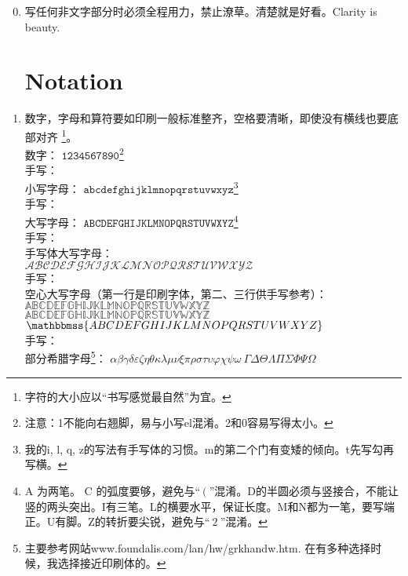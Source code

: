 \documentclass[11pt, a4paper, titlepage]{article}
\begin{document}
\begin{enumerate}\setcounter{enumi}{-1}
\item 写任何非文字部分时必须全程用力，禁止潦草。清楚就是好看。Clarity is beauty.

\part{Notation}
\item 数字，字母和算符要如印刷一般标准整齐，空格要清晰，即使没有横线也要底部对齐    \footnote{字符的大小应以“书写感觉最自然”为宜。}。\\
    数字：
    {\fontsize{14pt}{1} $\mathtt{1234567890}$}\footnote{注意：1不能向右翘脚，易与小写el混淆。2和0容易写得太小。}\\
    手写：\\[7pt]
    小写字母：
    {\fontsize{14pt}{1} $\mathtt{abcdefghijklmnopqrstuvwxyz}$}\footnote{我的i, l, q, z的写法有手写体的习惯。m的第二个门有变矮的倾向。t先写勾再写横。}\\
    手写：\\[7pt]
    大写字母：
    {\fontsize{14pt}{1}
    $\mathtt{ABCDEFGHIJKLMNOPQRSTUVWXYZ}$}\footnote{A 为两笔。 C 的弧度要够，避免与``$\:(\:$''混淆。D的半圆必须与竖接合，不能让竖的两头突出。I有三笔。L的横要水平，保证长度。M和N都为一笔，要写端正。U有脚。Z的转折要尖锐，避免与``$\:2\:$''混淆。}\\
    手写：\\[7pt]
    手写体大写字母：\\
    {\fontsize{14pt}{1}$\mathscr{ABCDEFGHIJKLMNOPQRSTUVWXYZ}$}\\
    手写：\\[7pt]
    空心大写字母（第一行是印刷字体，第二、三行供手写参考）：\\
    {\fontsize{14pt}{1}$\mathbb{ABCDEFGHIJKLMNOPQRSTUVWXYZ}$}\\
    {\fontsize{14pt}{1}$\mathds{ABCDEFGHIJKLMNOPQRSTUVWXYZ}$}\\
    {\fontsize{14pt}{1}$\mathbbmss{ABCDEFGHIJKLMNOPQRSTUVWXYZ}$}\\
    手写：\\[7pt]
    部分希腊字母\footnote{主要参考网站www.foundalis.com/lan/hw/grkhandw.htm. 在有多种选择时候，我选择接近印刷体的。}：
    {\fontsize{14pt}{1}
    $\alpha \beta \gamma \delta \varepsilon \zeta \eta \theta \kappa \lambda \mu \nu \xi \pi \rho \sigma \tau \upsilon \varphi \chi \psi \omega \: \Gamma \Delta \Theta \Lambda \Pi \Sigma \Phi \Psi \Omega$}

\end{enumerate}
\end{document}

